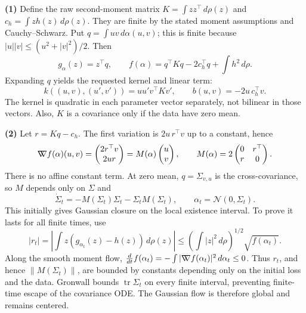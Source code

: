 \documentclass[11pt,a4paper]{article}
\theoremstyle{exostyle}
\newcommand{\gradW}{\mathord{\nabla\mkern-9.3mu\nabla}}
\begin{document}
\begin{solution}
\textbf{(1)} Define the raw second-moment matrix $K=\int zz^\top\,d\rho(z)$ and $c_h=\int zh(z)\,d\rho(z)$. They are finite by the stated moment assumptions and Cauchy--Schwarz. Put $q=\int uv\,d\alpha(u,v)$; this is finite because $|u||v|\le(u^2+|v|^2)/2$. Then
\[
g_\alpha(z)=z^\top q,\qquad
f(\alpha)=q^\top Kq-2c_h^\top q+\int h^2\,d\rho.
\]
Expanding $q$ yields the requested kernel and linear term:
\[
k((u,v),(u',v'))=uu'v^\top Kv',\qquad b(u,v)=-2u\,c_h^\top v.
\]
The kernel is quadratic in each parameter vector separately, not bilinear in those vectors. Also, $K$ is a covariance only if the data have zero mean.

\textbf{(2)} Let $r=Kq-c_h$. The first variation is $2u\,r^\top v$ up to a constant, hence
\[
\gradW f(\alpha)(u,v)=\begin{pmatrix}2r^\top v\\2ur\end{pmatrix}
=M(\alpha)\begin{pmatrix}u\\v\end{pmatrix},\qquad
M(\alpha)=2\begin{pmatrix}0&r^\top\\r&0\end{pmatrix}.
\]
There is no affine constant term. At zero mean, $q=\Sigma_{v,u}$ is the cross-covariance, so $M$ depends only on $\Sigma$ and
\[
\dot\Sigma_t=-M(\Sigma_t)\Sigma_t-\Sigma_tM(\Sigma_t),\qquad
\alpha_t=\mathcal N(0,\Sigma_t).
\]
This initially gives Gaussian closure on the local existence interval. To prove it lasts for all finite times, use
\[
|r_t|=\left|\int z(g_{\alpha_t}(z)-h(z))\,d\rho(z)\right|
\le\left(\int|z|^2\,d\rho\right)^{1/2}\sqrt{f(\alpha_t)}.
\]
Along the smooth moment flow,
$\frac d{dt}f(\alpha_t)=-\int|\gradW f(\alpha_t)|^2\,d\alpha_t\le0$.
Thus $r_t$, and hence $\|M(\Sigma_t)\|$, are bounded by constants depending only on the initial loss and the data. Gronwall bounds $\operatorname{tr}\Sigma_t$ on every finite interval, preventing finite-time escape of the covariance ODE. The Gaussian flow is therefore global and remains centered.
\end{solution}
\end{document}
